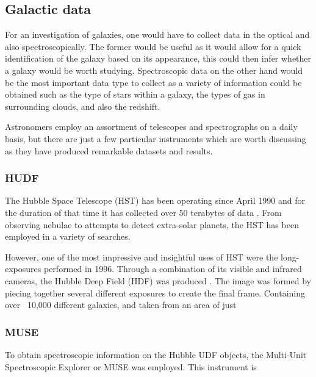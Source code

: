 \documentclass[12pt, twocolumn]{revtex4}    %
\begin{document}
\subsection{Galactic data} 

For an investigation of galaxies, one would have to collect data in the optical and also spectroscopically. The former would be useful as it would allow for a quick identification of the galaxy based on its appearance, this could then infer whether a galaxy would be worth studying. Spectroscopic data on the other hand would be the most important data type to collect as a variety of information could be obtained such as the type of stars within a galaxy, the types of gas in surrounding clouds, and also the redshift. 

Astronomers employ an assortment of telescopes and spectrographs on a daily basis, but there are just a few particular instruments which are worth discussing as they have produced remarkable datasets and results.

\subsubsection{HUDF}

The Hubble Space Telescope (HST) has been operating since April 1990 and for the duration of that time it has collected over 50 terabytes of data \cite{mccoy_hst}. From observing nebulae to attempts to detect extra-solar planets, the HST has been employed in a variety of searches. 

However, one of the most impressive and insightful uses of HST were the long-exposures performed in 1996. Through a combination of its visible and infrared cameras, the Hubble Deep Field (HDF) was produced \cite{mccoy_hst, williams_hdp}. The image was formed by piecing together several different exposures to create the final frame. Containing over ~10,000 different galaxies, and taken from an area of just 

\subsubsection{MUSE}

To obtain spectroscopic information on the Hubble UDF objects, the Multi-Unit Spectroscopic Explorer or MUSE was employed. This instrument is 


\onecolumngrid
\end{document}
